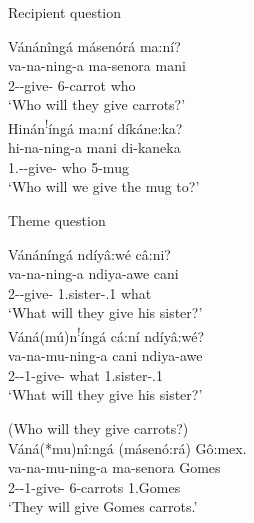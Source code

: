 \documentclass[output=paper]{langscibook}
\begin{document}
\ea\label{bkm:Ref121149061}Recipient question

\ea
Vánánîngá másenórá ma:ní?\\
\gll
va-na-ning-a  ma-senora  mani\\
2\SM{}-\FUT{}-give-\FV{}  6-carrot  who\\
\glt
‘Who will they give carrots?’\\


\ex
Hinán\textsuperscript{!}íngá ma:ní díkáne:ka?\\
\gll
hi-na-ning-a  mani  di-kaneka\\
1\PL.\SM{}-\FUT{}-give-\FV{}  who  5-mug\\
\glt
‘Who will we give the mug to?’\\

\z
\z

\ea\label{bkm:Ref121149063}Theme question

\ea
Vánáníngá ndíyâ:wé câ:ni?\\
\gll
va-na-ning-a  ndiya-awe  cani\\
2\SM{}-\FUT{}-give-\FV{}  1.sister-\POSS{}.1  what\\
\glt
‘What will they give his sister?’\\


\ex
Váná(mú)n\textsuperscript{!}íngá cá:ní ndíyâ:wé?\\
\gll
va-na-mu-ning-a  cani  ndiya-awe\\
2\SM{}-\FUT{}-1\OM{}-give-\FV{}  what  1.sister-\POSS{}.1\\
\glt
‘What will they give his sister?’\\

\z
\z

\ea
\label{bkm:Ref121149077}
(Who will they give carrots?)\\
Váná(*mu)nî:ngá (másenó:rá) Gô:mex.\\
\gll
va-na-mu-ning-a  ma-senora  Gomes\\
2\SM{}-\FUT{}-1\OM{}-give-\FV{}  6-carrots  1.Gomes\\
\glt
‘They will give Gomes carrots.’\\
\end{document}
